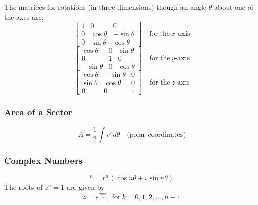 \documentclass{book}
\begin{document}
            The matrices for rotations (in three dimensions) though an angle $\theta$ about one of the axes are:
            \begin{equation}
                \begin{bmatrix}
                    1 & 0 & 0 \\
                    0 & \cos\theta & -\sin\theta \\
                    0 & \sin\theta & \cos\theta
                \end{bmatrix}
                \quad\text{for the}\ x\text{-axis}
            \end{equation}
            \begin{equation}
                \begin{bmatrix}
                    \cos\theta & 0 & \sin\theta \\
                    0 & 1 & 0 \\
                    -\sin\theta & 0 & \cos\theta
                \end{bmatrix}
                \quad\text{for the}\ y\text{-axis}
            \end{equation}
            \begin{equation}
                \begin{bmatrix}
                    \cos\theta & -\sin\theta & 0 \\
                    \sin\theta & \cos\theta & 0 \\
                    0 & 0 & 1
                \end{bmatrix}
                \quad\text{for the}\ z\text{-axis}
            \end{equation}



            \subsubsection{Area of a Sector}
            \begin{equation}
                A=\frac{1}{2}\int r^2d\theta\quad\text{(polar coordinates)}
            \end{equation}

            \subsubsection{Complex Numbers}
            \begin{equation}
                [r\cos\theta+i\sin\theta]^n=r^n(\cos n\theta+i\sin n\theta)
            \end{equation}
            The \glspl{root} of $z^n=1$ are given by
            \begin{equation}
                z=e^{\frac{2\pi ki}{n}},\ \text{for}\ k=0,1,2,\dots,n-1
            \end{equation}
\end{document}
